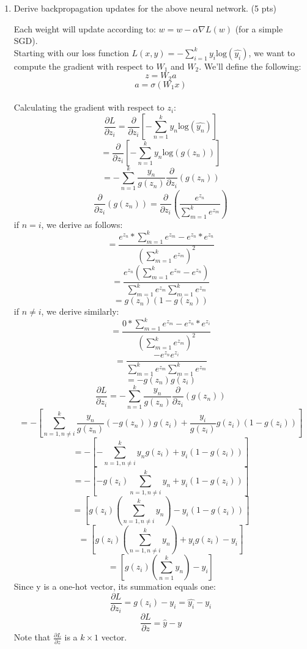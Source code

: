 \documentclass[a4paper]{article}
\theoremstyle{definition}
\newenvironment{soln}{
    \leavevmode\color{blue}\ignorespaces
}{}
\begin{document}
\begin{enumerate}
    \item Derive backpropagation updates for the above neural network. (5 pts)
    
    \begin{soln}
    	Each weight will update according to: $w = w - \alpha \nabla L(w)$ (for a simple SGD). \\
    	Starting with our loss function $L(x, y) = -\sum_{i=1}^k y_i \text{log}(\hat{y_i})$, we want to compute the gradient with respect to $W_1$ and $W_2$.
    	We'll define the following:
    	$$z = W_2a$$
    	$$a = \sigma (W_1x)$$
    	\\
    	Calculating the gradient with respect to $z_i$:
    	$$\frac{\partial L}{\partial z_i} = \frac{\partial}{\partial z_i} \left[-\sum_{n=1}^k y_n \text{log}(\hat{y_n})\right]$$
    	$$ = \frac{\partial}{\partial z_i} \left[-\sum_{n=1}^k y_n \text{log}(g(z_n))\right]$$
    	$$ = -\sum_{n=1}^k \frac{y_n}{g(z_n)} \frac{\partial}{\partial z_i}\left(g(z_n)\right)$$
    	$$\frac{\partial}{\partial z_i}\left(g(z_n)\right) = \frac{\partial}{\partial z_i}\left(\frac{e^{z_n}}{\sum_{m=1}^{k}e^{z_m}}\right)$$
    	if $n = i$, we derive as follows:
    	$$ = \frac{e^{z_n} * \sum_{m=1}^{k}e^{z_m} - e^{z_n} * e^{z_n}}{\left(\sum_{m=1}^{k}e^{z_m}\right)^2}$$
    	$$ = \frac{e^{z_n} \left(\sum_{m=1}^{k}e^{z_m} - e^{z_n}\right)}{\sum_{m=1}^{k}e^{z_m} \sum_{m=1}^{k}e^{z_m}}$$
    	$$ = g(z_n)(1 - g(z_n))$$
    	if $n \neq i$, we derive similarly:
    	$$ = \frac{0 * \sum_{m=1}^{k}e^{z_m} - e^{z_n} * e^{z_i}}{\left(\sum_{m=1}^{k}e^{z_m}\right)^2}$$
    	$$ = \frac{-e^{z_n}e^{z_i}}{\sum_{m=1}^{k}e^{z_m}\sum_{m=1}^{k}e^{z_m}}$$
    	$$ = -g(z_n) g(z_i)$$
    	$$\frac{\partial L}{\partial z_i} = -\sum_{n=1}^k \frac{y_n}{g(z_n)} \frac{\partial}{\partial z_i}\left(g(z_n)\right)$$
    	$$ = - \left[\sum_{n=1, n \neq i}^{k} \frac{y_n}{g(z_n)} (-g(z_n))g(z_i) + \frac{y_i}{g(z_i)} g(z_i)(1 - g(z_i))\right]$$
    	$$ = - \left[- \sum_{n=1, n \neq i}^{k} y_n g(z_i) + y_i (1 - g(z_i))\right]$$
    	$$ = - \left[- g(z_i) \sum_{n=1, n \neq i}^{k} y_n + y_i (1 - g(z_i))\right]$$
    	$$ = \left[g(z_i) \left( \sum_{n=1, n \neq i}^{k} y_n \right) - y_i (1 - g(z_i))\right]$$
    	$$ = \left[g(z_i) \left( \sum_{n=1, n \neq i}^{k} y_n \right) + y_i g(z_i) - y_i\right]$$
    	$$ = \left[g(z_i) \left( \sum_{n=1}^{k} y_n \right) - y_i\right]$$
    	Since y is a one-hot vector, its summation equals one:
    	$$\frac{\partial L}{\partial z_i} = g(z_i) - y_i = \hat{y_i} - y_i$$
    	$$\frac{\partial L}{\partial z} = \hat{y} - y$$
    	Note that $\frac{\partial L}{\partial z}$ is a $k \times 1$ vector.
    	

\end{soln}
\end{enumerate}
\end{document}
